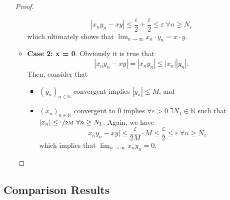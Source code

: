 \documentclass{article}
\newcommand{\N}{\mathbb{N}}
\newcommand{\seq}[2]{(#1_{#2})_{#2 \in \N}}
\newcommand{\?}{\stackrel{?}{=}}
\newcommand{\smallblacksquare}{\rule{0.5em}{0.5em}}
\theoremstyle{definition} %
\begin{document}
\begin{itemize}
\begin{proof}
\begin{itemize}[label=\smallblacksquare]
            $$|x_ny_n - xy| \leq \frac{\varepsilon}{2} + \frac{\varepsilon}{2} \leq \varepsilon \ \forall n \geq N_\varepsilon$$
            which ultimately shows that $\lim_{n \to \infty} x_n \cdot y_n = x \cdot y$.
            \item \textbf{Case 2: x = 0}. Obviously it is true that
            $$|x_ny_n - xy| = |x_ny_n| \leq |x_n||y_n|.$$
            Then, consider that
            \begin{itemize}
                \item $\seq{y}{n}$ convergent implies $|y_n| \leq M$, and
                \item $\seq{x}{n}$ convergent to 0 implies $\forall \varepsilon > 0 \ \exists N_1 \in \N$ such that $|x_n| \leq \nicefrac{\varepsilon}{2M} \ \forall n \geq N_1$. Again, we have
                $$x_ny_n - xy| \leq \frac{\varepsilon}{2M} \cdot M \leq \frac{\varepsilon}{2} \leq \varepsilon \ \forall n \geq N_1$$
                which implies that $\lim_{n \to \infty} x_ny_n = 0$.
            \end{itemize}
        \end{itemize}
    \end{proof}
\end{itemize}

\subsection{Comparison Results}
\end{document}
